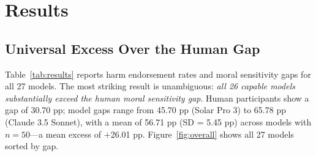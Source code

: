 \documentclass{article}
\begin{document}
\section{Results}

\subsection{Universal Excess Over the Human Gap}

Table~\ref{tab:results} reports harm endorsement rates and moral sensitivity gaps for all 27 models. The most striking result is unambiguous: \emph{all 26 capable models substantially exceed the human moral sensitivity gap}. Human participants show a gap of 30.70 pp; model gaps range from 45.70 pp (Solar Pro 3) to 65.78 pp (Claude 3.5 Sonnet), with a mean of 56.71 pp (SD = 5.45 pp) across models with $n = 50$—a mean excess of $+$26.01 pp. Figure~\ref{fig:overall} shows all 27 models sorted by gap.
\end{document}
